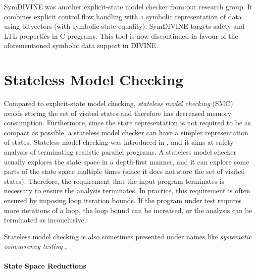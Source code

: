 SymDIVINE  was another explicit-state model checker from our research group.
It combines explicit control flow handling with a symbolic representation of data
using bitvectors (with symbolic state equality).
SymDIVINE targets safety and LTL properties in C programs.
This tool is now discontinued in favour of the aforementioned symbolic data support
in DIVINE.


\section{Stateless Model Checking}\label{sec:stateoftheart:smc}

Compared to explicit-state model checking, \emph{stateless model checking}
(SMC) avoids storing the set of visited states and therefore has decreased
memory consumption.
Furthermore, since the state representation is not required to be as compact as
possible, a stateless model checker can have a simpler representation of states.
Stateless model checking was introduced in , and it aims
at safety analysis of terminating realistic parallel programs.
A stateless model checker usually explores the state space in a depth-first
manner, and it can explore some parts of the state space multiple times (since
it does not store the set of visited states).
Therefore, the requirement that the input program terminates is necessary to
ensure the analysis terminates.
In practice, this requirement is often ensured by imposing loop iteration
bounds.
If the program under test requires more iterations of a loop, the loop bound
can be increased, or the analysis can be terminated as inconclusive.

Stateless model checking is also sometimes presented under names like \emph{systematic concurrency testing} .

\paragraph{State Space Reductions}

